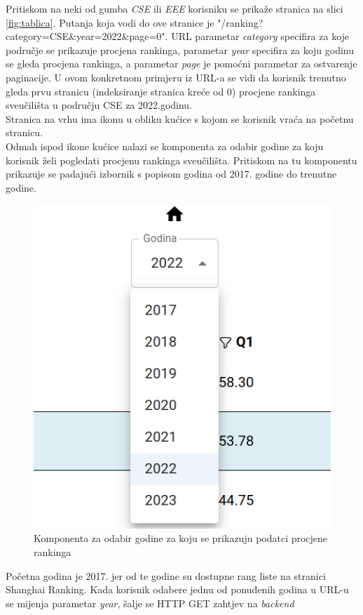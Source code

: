 \documentclass[times, utf8, zavrsni]{fer}
\begin{document}
Pritiskom na neki od gumba \emph{CSE} ili \emph{EEE} korisniku se prikaže stranica na slici \ref{fig:tablica}. Putanja koja vodi do ove stranice 
je "/ranking?category=CSE\&year=2022\&page=0".
URL parametar \emph{category} specifira za koje područje se prikazuje procjena rankinga, parametar \emph{year} specifira 
za koju godinu se gleda procjena rankinga, a parametar \emph{page} je pomoćni parametar za ostvarenje paginacije.  
U ovom konkretnom primjeru iz URL-a se vidi da korisnik trenutno gleda prvu stranicu (indeksiranje stranica kreće od 0) procjene rankinga sveučilišta u području CSE za 2022.godinu.
\\Stranica na vrhu ima ikonu u obliku kućice s kojom se korisnik vraća na početnu stranicu. \\Odmah ispod ikone kućice nalazi se komponenta
za odabir godine za koju korisnik želi pogledati procjenu rankinga sveučilišta. Pritiskom na tu komponentu prikazuje se padajući izbornik 
s popisom godina od 2017. godine do trenutne godine. 
\begin{figure}[htb]
    \centering
       \includegraphics[scale=0.24]{select.png} 
       \caption{Komponenta za odabir godine za koju se prikazuju podatci procjene rankinga}
       \label{fig:select}
       \end{figure}
Početna godina je 2017. jer od te godine su dostupne rang liste na stranici 
Shanghai Ranking. Kada korisnik odabere jednu od ponuđenih godina u URL-u se mijenja parametar \emph{year}, šalje se HTTP GET zahtjev na \emph{backend}
\end{document}
